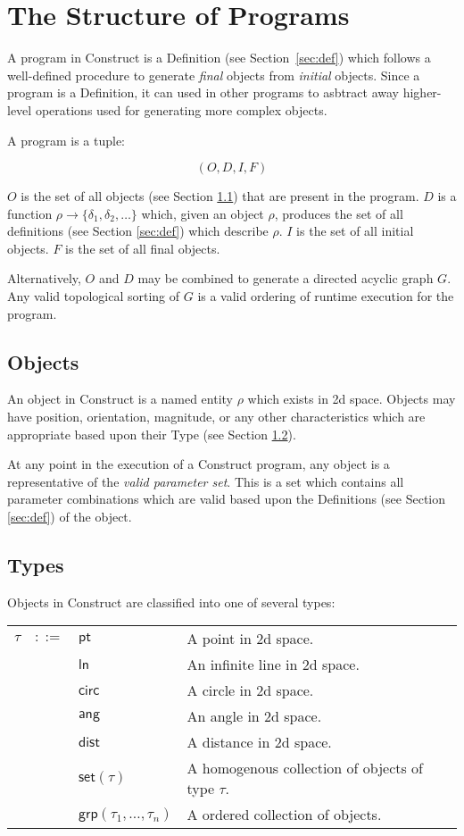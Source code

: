 \documentclass[11pt]{report}
\begin{document}
\chapter{The Structure of Programs}
\label{chap:struct}

A program in Construct is a Definition (see Section~\ref{sec:def}) which follows a well-defined procedure to generate {\it final} objects from {\it initial} objects. 
Since a program is a Definition, it can used in other programs to asbtract away higher-level operations used for generating more complex objects.

A program is a tuple:

$$(O, D, I, F)$$

$O$ is the set of all objects (see Section \ref{sec:obj}) that are present in the program. 
$D$ is a function $\rho \to \{\delta_1, \delta_2, \dots\}$ which, given an object $\rho$, produces the set of all definitions (see Section \ref{sec:def}) which describe $\rho$. 
$I$ is the set of all initial objects. 
$F$ is the set of all final objects.

Alternatively, $O$ and $D$ may be combined to generate a directed acyclic graph $G$. 
Any valid topological sorting of $G$ is a valid ordering of runtime execution for the program.

\section{Objects}
\label{sec:obj}

An object in Construct is a named entity $\rho$ which exists in 2d space. 
Objects may have position, orientation, magnitude, or any other characteristics which are appropriate based upon their Type (see Section \ref{sec:types}). 

At any point in the execution of a Construct program, any object is a representative of the {\it valid parameter set}. 
This is a set which contains all parameter combinations which are valid based upon the Definitions (see Section \ref{sec:def}) of the object.

\section{Types}
\label{sec:types}

Objects in Construct are classified into one of several types:\\

\noindent\begin{tabularx}{\textwidth}{l l l X}
$\tau$ & $::=$ & $\mathsf{pt}$ & A point in 2d space. \\
 & & $\mathsf{ln}$ & An infinite line in 2d space. \\
 & & $\mathsf{circ}$ & A circle in 2d space. \\
 & & $\mathsf{ang}$ & An angle in 2d space. \\
 & & $\mathsf{dist}$ & A distance in 2d space. \\
 & & $\mathsf{set}(\tau)$ & A homogenous collection of objects of type $\tau$. \\
 & & $\mathsf{grp}(\tau_1, \dots, \tau_n)$ & A ordered collection of objects.
\end{tabularx}
\end{document}
